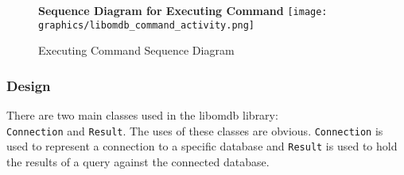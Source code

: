 \documentclass[letterpaper, 12pt]{article}
\newcommand{\inlinecode}[1]{\colorbox{codegrey}{\lstinline[language=C++]{#1}}}
\begin{document}
  \begin{figure}
    \centering
    \textbf{Sequence Diagram for Executing Command}
    \texttt{[image: graphics/libomdb\_command\_activity.png]}
    \caption{Executing Command Sequence Diagram}
  \end{figure}

  \par\vspace{\baselineskip}

  \subsubsection{Design}
  There are two main classes used in the libomdb library:  \\
  \inlinecode{Connection} and \inlinecode{Result}. The uses of these classes
  are obvious. \inlinecode{Connection} is used to represent a connection to
  a specific database and \inlinecode{Result} is used to hold the results of a
  query against the connected database.
\end{document}
